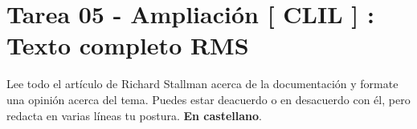 \documentclass[11pt]{article}
\begin{document}
\section{Tarea 05 - Ampliación [ CLIL ] : Texto completo RMS}
\label{sec:org1ba032c}

Lee todo el artículo de Richard Stallman acerca de la documentación y formate una opinión acerca del tema.
Puedes estar deacuerdo o en desacuerdo con él, pero redacta en varias líneas tu postura. \textbf{En castellano}.
\end{document}
